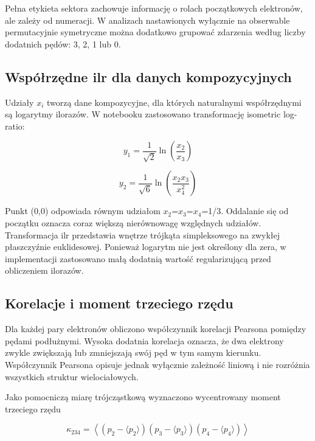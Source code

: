 \documentclass[12pt,letterpaper,oneside]{report}
\numberwithin{equation}{chapter}
\numberwithin{figure}{chapter}
\numberwithin{table}{chapter}
\begin{document}
Pełna etykieta sektora zachowuje informację o rolach początkowych
elektronów, ale zależy od numeracji. W analizach nastawionych wyłącznie
na obserwable permutacyjnie symetryczne można dodatkowo grupować
zdarzenia według liczby dodatnich pędów: 3, 2, 1 lub 0.

\subsection{Współrzędne ilr dla danych kompozycyjnych}

Udziały \ensuremath{x_i} tworzą dane kompozycyjne, dla których naturalnymi
współrzędnymi są logarytmy ilorazów. W notebooku zastosowano
transformację isometric log-ratio:

\begin{equation}
y_1=\frac{1}{\sqrt2}\ln\!\left(\frac{x_2}{x_3}\right)
\label{eq:18}
\end{equation}

\begin{equation}
y_2=\frac{1}{\sqrt6}\ln\!\left(\frac{x_2x_3}{x_4^2}\right)
\label{eq:19}
\end{equation}

Punkt (0,0) odpowiada równym udziałom \ensuremath{x_2}=\ensuremath{x_3}=\ensuremath{x_4}=1/3. Oddalanie się od
początku oznacza coraz większą nierównowagę względnych udziałów.
Transformacja ilr przedstawia wnętrze trójkąta simpleksowego na zwykłej
płaszczyźnie euklidesowej. Ponieważ logarytm nie jest określony dla
zera, w implementacji zastosowano małą dodatnią wartość regularizującą
przed obliczeniem ilorazów.

\subsection{Korelacje i moment trzeciego rzędu}

Dla każdej pary elektronów obliczono współczynnik korelacji Pearsona
pomiędzy pędami podłużnymi. Wysoka dodatnia korelacja oznacza, że dwa
elektrony zwykle zwiększają lub zmniejszają swój pęd w tym samym
kierunku. Współczynnik Pearsona opisuje jednak wyłącznie zależność
liniową i nie rozróżnia wszystkich struktur wielociałowych.

Jako pomocniczą miarę trójcząstkową wyznaczono wycentrowany moment
trzeciego rzędu

\begin{equation}
\kappa_{234}=\left\langle (p_2-\langle p_2\rangle)(p_3-\langle p_3\rangle)(p_4-\langle p_4\rangle)\right\rangle
\label{eq:20}
\end{equation}
\end{document}
